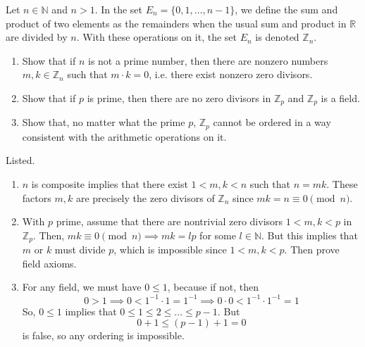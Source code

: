   \begin{exercise}[Zorich 2.2.22]
    Let $n \in \mathbb{N}$ and $n > 1$. In the set $E_n = \{0, 1, \ldots, n-1\}$, we define the sum and product of two elements as the remainders when the usual sum and product in $\mathbb{R}$ are divided by $n$. With these operations on it, the set $E_n$ is denoted $\mathbb{Z}_n$. 
    \begin{enumerate}
      \item Show that if $n$ is not a prime number, then there are nonzero numbers $m, k \in \mathbb{Z}_n$ such that $m \cdot k = 0$, i.e. there exist nonzero zero divisors. 
      \item Show that if $p$ is prime, then there are no zero divisors in $\mathbb{Z}_p$ and $\mathbb{Z}_p$ is a field. 
      \item Show that, no matter what the prime $p$, $\mathbb{Z}_p$ cannot be ordered in a way consistent with the arithmetic operations on it. 
    \end{enumerate}
  \end{exercise}
  \begin{solution}
    Listed. 
    \begin{enumerate}
      \item $n$ is composite implies that there exist $1 < m, k < n$ such that $n = m k$. These factors $m, k$ are precisely the zero divisors of $\mathbb{Z}_n$ since $m k = n \equiv 0 \pmod{n}$. 
      \item With $p$ prime, assume that there are nontrivial zero divisors $1 < m, k < p$ in $\mathbb{Z}_p$. Then, $m k \equiv 0 \pmod{n} \implies m k = l p$ for some $l \in \mathbb{N}$. But this implies that $m$ or $k$ must divide $p$, which is impossible since $1 < m, k < p$. Then prove field axioms. 
      \item For any field, we must have $0 \leq 1$, because if not, then 
      \begin{equation}
        0 > 1 \implies 0 < 1^{-1} \cdot 1 = 1^{-1} \implies 0 \cdot 0 < 1^{-1} \cdot 1^{-1} = 1
      \end{equation}
      So, $0 \leq 1$ implies that $0 \leq 1 \leq 2 \leq \ldots \leq p-1$. But 
      \begin{equation}
        0 + 1 \leq (p - 1) + 1 = 0
      \end{equation}
      is false, so any ordering is impossible. 
    \end{enumerate}
  \end{solution}

